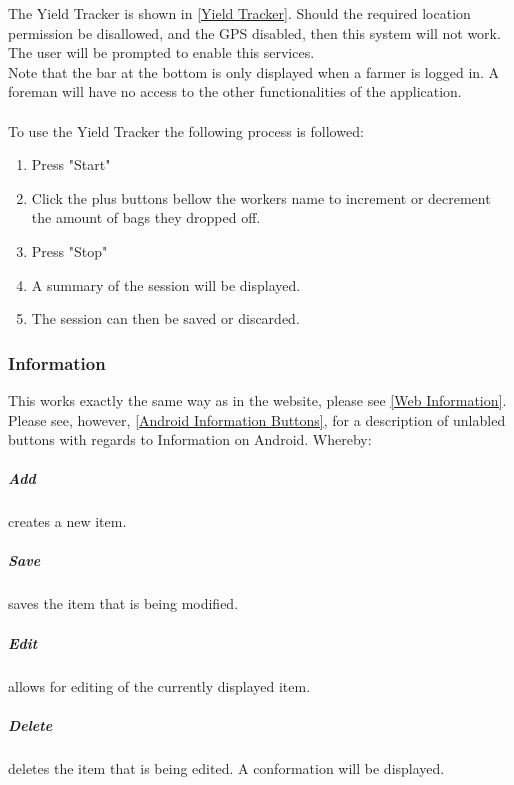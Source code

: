 \documentclass[11pt]{article}
\begin{document}
The Yield Tracker is shown in \ref{Yield Tracker}. Should the required location permission be disallowed, and the GPS disabled, then this system will not work. The user will be prompted to enable this services.\\
Note that the bar at the bottom is only displayed when a farmer is logged in. A foreman will have no access to the other functionalities of the application.\\
\\
To use the Yield Tracker the following process is followed:
\begin{enumerate}
\item Press "Start"
\item Click the plus buttons bellow the workers name to increment or decrement the amount of bags they dropped off.
\item Press "Stop"
\item A summary of the session will be displayed.
\item The session can then be saved or discarded.
\end{enumerate}

\subsubsection{Information}
\label{Mobile Information}
This works exactly the same way as in the website, please see \ref{Web Information}.\\
Please see, however, \ref{Android Information Buttons}, for a description of unlabled buttons with regards to Information on Android. Whereby:
\subparagraph{Add} creates a new item.
\subparagraph{Save} saves the item that is being modified.
\subparagraph{Edit} allows for editing of the currently displayed item.
\subparagraph{Delete} deletes the item that is being edited. A conformation will be displayed.
\end{document}
